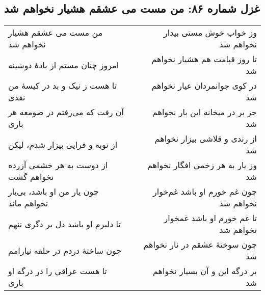 \begin{center}
\section*{غزل شماره ۸۶: من مست می عشقم هشیار نخواهم شد}
\label{sec:086}
\begin{longtable}{l p{0.5cm} r}
من مست می عشقم هشیار نخواهم شد
&&
وز خواب خوش مستی بیدار نخواهم شد
\\
امروز چنان مستم از بادهٔ دوشینه
&&
تا روز قیامت هم هشیار نخواهم شد
\\
تا هست ز نیک و بد در کیسهٔ من نقدی
&&
در کوی جوانمردان عیار نخواهم شد
\\
آن رفت که می‌رفتم در صومعه هر باری
&&
جز بر در میخانه این بار نخواهم شد
\\
از توبه و قرایی بیزار شدم، لیکن
&&
از رندی و قلاشی بیزار نخواهم شد
\\
از دوست به هر خشمی آزرده نخواهم گشت
&&
وز یار به هر زخمی افگار نخواهم شد
\\
چون یار من او باشد، بی‌یار نخواهم ماند
&&
چون غم خورم او باشد غم‌خوار نخواهم شد
\\
تا دلبرم او باشد دل بر دگری ننهم
&&
تا غم خورم او باشد غمخوار نخواهم شد
\\
چون ساختهٔ دردم در حلقه نیارامم
&&
چون سوختهٔ عشقم در نار نخواهم شد
\\
تا هست عراقی را در درگه او باری
&&
بر درگه این و آن بسیار نخواهم شد
\\
\end{longtable}
\end{center}
